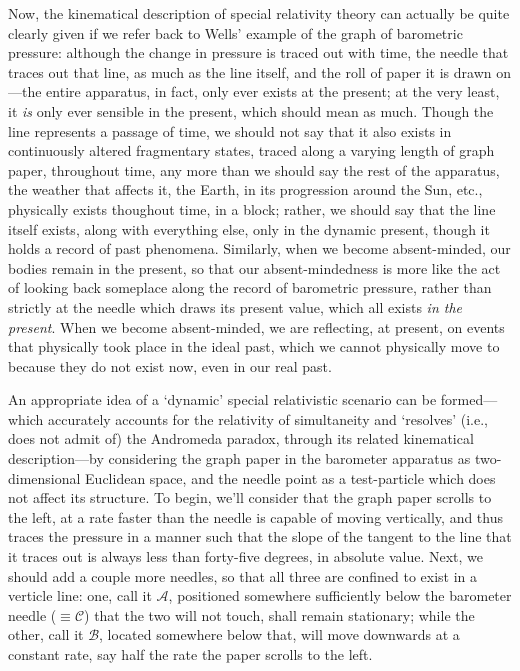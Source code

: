 Now, the kinematical description of special relativity theory can actually be quite clearly given if we refer back to Wells' example of the graph of barometric pressure: although the change in pressure is traced out with time, the needle that traces out that line, as much as the line itself, and the roll of paper it is drawn on---the entire apparatus, in fact, only ever exists at the present; at the very least, it \textit{is} only ever sensible in the present, which should mean as much. Though the line represents a passage of time, we should not say that it also exists in continuously altered fragmentary states, traced along a varying length of graph paper, throughout time, any more than we should say the rest of the apparatus, the weather that affects it, the Earth, in its progression around the Sun, etc., physically exists thoughout time, in a block; rather, we should say that the line itself exists, along with everything else, only in the dynamic present, though it holds a record of past phenomena. Similarly, when we become absent-minded, our bodies remain in the present, so that our absent-mindedness is more like the act of looking back someplace along the record of barometric pressure, rather than strictly at the needle which draws its present value, which all exists \textit{in the present}. When we become absent-minded, we are reflecting, at present, on events that physically took place in the ideal past, which we cannot physically move to because they do not exist now, even in our real past.

An appropriate idea of a `dynamic' special relativistic scenario can be formed---which accurately accounts for the relativity of simultaneity and `resolves' (i.e., does not admit of) the Andromeda paradox, through its related kinematical description---by considering the graph paper in the barometer apparatus as two-dimensional Euclidean space, and the needle point as a test-particle which does not affect its structure. To begin, we'll consider that the graph paper scrolls to the left, at a rate faster than the needle is capable of moving vertically, and thus traces the pressure in a manner such that the slope of the tangent to the line that it traces out is always less than forty-five degrees, in absolute value. Next, we should add a couple more needles, so that all three are confined to exist in a verticle line: one, call it $\mathcal{A}$, positioned somewhere sufficiently below the barometer needle ($\equiv\mathcal{C}$) that the two will not touch, shall remain stationary; while the other, call it $\mathcal{B}$, located somewhere below that, will move downwards at a constant rate, say half the rate the paper scrolls to the left.

